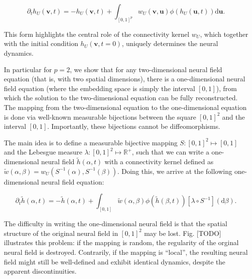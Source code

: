 \documentclass[10pt,letterpaper]{article}
\def\d{\mathrm d}
\renewcommand{\vec}[1]{\boldsymbol{#1}}
\begin{document}
\begin{equation} \label{eq:nf-in-01p}
\partial_t h_U(\vec v, t) = -h_U(\vec v, t) + \int_{[0,1]^p} w_U(\vec v, \vec u) \phi(h_U(\vec u, t)) \mathrm d \vec u.
\end{equation}

This form highlights the central role of the connectivity kernel $w_U$, which together with the initial condition $h_U(\vec v, t=0)$, uniquely determines the neural dynamics.


In particular for $p=2$, we show that for any two-dimensional neural field equation (that is, with two spatial dimensions), there is a one-dimensional neural field equation (where the embedding space is simply the interval $[0,1]$), from which the solution to the two-dimensional equation can be fully reconstructed. The mapping from the two-dimensional equation to the one-dimensional equation is done via well-known measurable bijections between the square $[0,1]^2$ and the interval $[0,1]$. Importantly, these bijections cannot be diffeomorphisms.

The main idea is to define a measurable bijective mapping $S : [0,1]^2 \mapsto [0,1]$ and the Lebesgue measure $\lambda : [0,1]^2 \mapsto \mathbb{R}^+$, such that we can write a one-dimensional neural field	$\tilde h(\alpha, t)$ with a connectivity kernel defined as $\tilde w(\alpha, \beta) = w_U(S^{-1}(\alpha), S^{-1}(\beta))$. Doing this, we arrive at the following one-dimensional neural field equation: 

\begin{equation} \label{eq:nf-in-01}
\partial_t \tilde h(\alpha, t) = -\tilde h(\alpha, t) + \int_{[0,1]} \tilde w(\alpha, \beta) \phi(\tilde h(\beta, t)) \left[\lambda \circ S^{-1}\right](\d \beta).
\end{equation}

The difficulty in writing the one-dimensional neural field is that the spatial structure of the original neural field in $[0,1]^2$ may be lost.
Fig. [TODO] illustrates this problem: if the mapping is random, the regularity of the orginal neural field is destroyed. Contrarily, if the mapping is ``local'', the resulting neural field might still be well-defined and exhibit identical dynamics, despite the apparent discontinuities.
\end{document}
